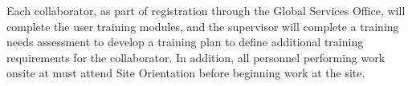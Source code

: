 Each  collaborator, as part of registration through the \fnal Global Services Office,
will complete the user  training modules, and the supervisor
will complete a training needs assessment to develop a training plan
to define additional   training requirements for the collaborator.
In addition, all personnel performing work onsite at  must
attend   Site Orientation before beginning work at the site.
\begin{comment}
All work activities
shall be subject to work planning and hazard analysis. 
Work planning ensures the scope of
the job is understood, appropriate materials are available, all
hazards have been identified, mitigation efforts established, and all
affected employees understand what is expected of them.   
All work planning documentation will be reviewed and
approved by the \dword{dune} \dword{esh} coordinator and the \dword{dune}
\dword{esh} review committee before beginning work activities.

A safety data sheet must be supplied for all chemicals and
hazardous materials used on site. All chemicals and hazardous
materials brought to the \dword{surf} site must be reviewed/approved by the
\dword{dune} \dword{esh} coordinator and the \dword{surf} \dword{esh}
department before arriving on site.

An emergency management program will be in place that incorporates an \dword{ert},  trained guides on all underground levels during all shifts, and protocols for treating injuries, accidents, or spills.

Fire and life safety requirements for \dword{lbnf-dune} areas
were analyzed in the \dword{lbnf-dune} Far Site Fire and Life
Safety Assessment. All caverns will be equipped with fire detection
and suppression systems with both visual and auditory notification.  
\dword{surf} will monitor all fire alarms and system supervisory signals, and the \dword{surf} \dword{ert}. 
will respond to the signals, with additional support from the local Lead-Deadwood Fire
Department as needed.  The caverns will also be equipped
with an \dword{odh} monitoring and alarm system with independent visual and
auditory notification systems.


All workers on the \dword{dune} project have the
authority to stop work in any situation that presents an imminent
threat to safety, health, and the environment. Work may not resume
until the circumstances are investigated and deficiencies corrected,
including the concurrence of the \dword{dune} \dword{ipd}
and the \dword{lbnf-dune} \dword{esh} manager.
\end{comment}

